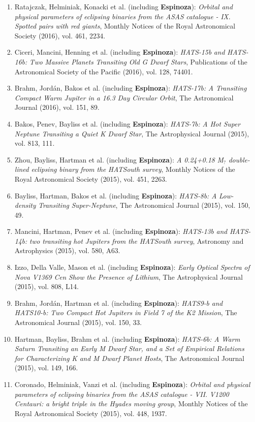 \documentclass[11pt, a4paper]{article} %
\begin{document}
\begin{flushleft}
\begin{enumerate}
\item Ratajczak, Helminiak, Konacki et al. (including \textbf{Espinoza}): \textit{Orbital and physical parameters of eclipsing binaries from the ASAS catalogue - IX. Spotted pairs with red giants}, Monthly Notices of the Royal Astronomical Society (2016), vol. 461, 2234.
\item Ciceri, Mancini, Henning et al. (including \textbf{Espinoza}): \textit{HATS-15b and HATS-16b: Two Massive Planets Transiting Old G Dwarf Stars}, Publications of the Astronomical Society of the Pacific (2016), vol. 128, 74401.
\item Brahm, Jord\'an, Bakos et al. (including \textbf{Espinoza}): \textit{HATS-17b: A Transiting Compact Warm Jupiter in a 16.3 Day Circular Orbit}, The Astronomical Journal (2016), vol. 151, 89.
\item Bakos, Penev, Bayliss et al. (including \textbf{Espinoza}): \textit{HATS-7b: A Hot Super Neptune Transiting a Quiet K Dwarf Star}, The Astrophysical Journal (2015), vol. 813, 111.
\item Zhou, Bayliss, Hartman et al. (including \textbf{Espinoza}): \textit{A 0.24+0.18 M$_{?}$ double-lined eclipsing binary from the HATSouth survey}, Monthly Notices of the Royal Astronomical Society (2015), vol. 451, 2263.
\item Bayliss, Hartman, Bakos et al. (including \textbf{Espinoza}): \textit{HATS-8b: A Low-density Transiting Super-Neptune}, The Astronomical Journal (2015), vol. 150, 49.
\item Mancini, Hartman, Penev et al. (including \textbf{Espinoza}): \textit{HATS-13b and HATS-14b: two transiting hot Jupiters from the HATSouth survey}, Astronomy and Astrophysics (2015), vol. 580, A63.
\item Izzo, Della Valle, Mason et al. (including \textbf{Espinoza}): \textit{Early Optical Spectra of Nova V1369 Cen Show the Presence of Lithium}, The Astrophysical Journal (2015), vol. 808, L14.
\item Brahm, Jord\'an, Hartman et al. (including \textbf{Espinoza}): \textit{HATS9-b and HATS10-b: Two Compact Hot Jupiters in Field 7 of the K2 Mission}, The Astronomical Journal (2015), vol. 150, 33.
\item Hartman, Bayliss, Brahm et al. (including \textbf{Espinoza}): \textit{HATS-6b: A Warm Saturn Transiting an Early M Dwarf Star, and a Set of Empirical Relations for Characterizing K and M Dwarf Planet Hosts}, The Astronomical Journal (2015), vol. 149, 166.
\item Coronado, Helminiak, Vanzi et al. (including \textbf{Espinoza}): \textit{Orbital and physical parameters of eclipsing binaries from the ASAS catalogue - VII. V1200 Centauri: a bright triple in the Hyades moving group}, Monthly Notices of the Royal Astronomical Society (2015), vol. 448, 1937.

\end{enumerate}
\end{flushleft}
\end{document}
